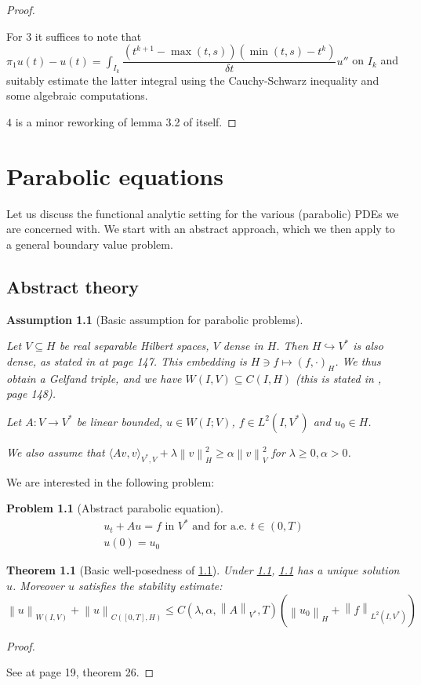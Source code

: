 \documentclass[english,a4paper,9pt,oneside]{scrbook}	%
\theoremstyle{break}
\newtheorem{thm}[equation]{Theorem}
\newtheorem{ass}[equation]{Assumption}
\newtheorem{pb}[equation]{Problem}
\newenvironment{mproof}[1][\proofname]{%
  \begin{proof}[#1]$ $\par\nobreak\ignorespaces
}{%
  \end{proof}
}
\renewcommand*{\proofname}{Proof}
\theoremstyle{remark}
\newcommand{\ds}{\displaystyle}
\newcommand{\norm}[1]{\left\lVert#1\right\rVert}
\newcommand{\HN}[1]{\norm{#1}_{H}}
\newcommand{\VN}[1]{\norm{#1}_{V}}
\newcommand{\VSN}[1]{\norm{#1}_{V^*}}
\begin{document}
\begin{appendices}
\begin{mproof}
For $3$ it suffices to note that $\pi_1 u(t) - u(t) = \ds \int_{I_k} \dfrac{(t^{k+1}-\max(t,s))(\min(t, s)-t^k)}{\delta t}u''$ on $I_k$ and suitably estimate the latter integral using the Cauchy-Schwarz inequality and some algebraic computations.

$4$ is a minor reworking of lemma 3.2 of \cite{lshou} itself.
\end{mproof}

\chapter{Parabolic equations}
\label{chap:parab_eq}

Let us discuss the functional analytic setting for the various (parabolic) PDEs we are concerned with. We start with an abstract approach, which we then apply to a general boundary value problem.

\section{Abstract theory}

\begin{ass}[Basic assumption for parabolic problems]
\label{ass:basic_par}

Let $V\subseteq H$ be real separable Hilbert spaces, $V$ dense in $H$. Then $H\hookrightarrow V^*$ is also dense, as stated in \cite{trol} at page 147. This embedding is $H \ni f \mapsto (f, \cdot )_H$. We thus obtain a Gelfand triple, and we have $W(I,V)\subseteq C(I,H)$ (this is stated in \cite{trol}, page 148).

Let $A:V\rightarrow V^* $ be linear bounded, $u \in W(I;V)$, $f \in L^2(I,V^*)$ and $u_0 \in H$.

We also assume that $\langle Av, v \rangle_{V^*,V}+ \lambda \HN{v}^2\geq \alpha \VN{v}^2$ for $\lambda \geq 0, \alpha >0$.
\end{ass}

We are interested in the following problem:

\begin{pb}[Abstract parabolic equation]
\label{eqn:general_parabolic}
\begin{align}
	u_t+Au=f \text{ in }V^* \text{ and for a.e. } t \in (0,T)\\
	u(0)=u_0
\end{align}
\end{pb}

\begin{thm}[Basic well-posedness of \cref{eqn:general_parabolic}]
\label{thm:well_pos_parabolic}
Under \cref{ass:basic_par}, \cref{eqn:general_parabolic} has a unique solution $u$. Moreover $u$ satisfies the stability estimate:
\begin{equation}
	\label{eqn:en_est}
	\norm{u}_{W(I,V)} + \norm{u}_{C([0,T],H)}\leq C(\lambda, \alpha, \VSN{A}, T)(\HN{u_0}+\norm{f}_{L^2(I,V^*)})
\end{equation} 
\end{thm}
\begin{mproof}
See \cite{gilardi} at page 19, theorem 26.
\end{mproof}


\end{appendices}
\end{document}
